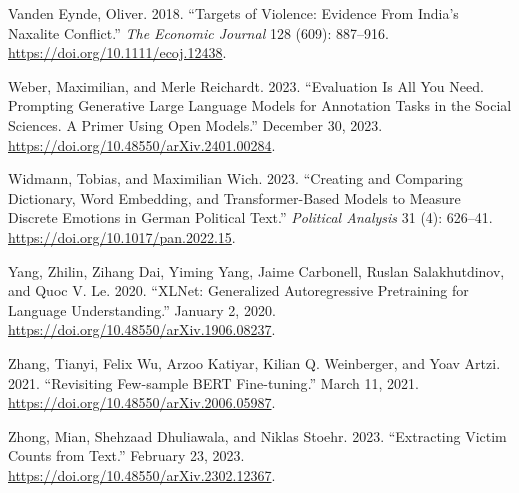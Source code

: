 \documentclass[
  11pt,
]{article}
\newlength{\cslhangindent}
\newenvironment{CSLReferences}[2] %
 {\begin{list}{}{%
  \setlength{\itemindent}{0pt}
  \setlength{\leftmargin}{0pt}
  \setlength{\parsep}{0pt}
  \ifodd #1
   \setlength{\leftmargin}{\cslhangindent}
   \setlength{\itemindent}{-1\cslhangindent}
  \fi
  \setlength{\itemsep}{#2\baselineskip}}}
 {\end{list}}
\begin{document}
\begin{CSLReferences}{1}{0}
Vanden Eynde, Oliver. 2018. {``Targets of {Violence}: {Evidence From
India}'s {Naxalite Conflict}.''} \emph{The Economic Journal} 128 (609):
887--916. \url{https://doi.org/10.1111/ecoj.12438}.

Weber, Maximilian, and Merle Reichardt. 2023. {``Evaluation Is All You
Need. {Prompting Generative Large Language Models} for {Annotation
Tasks} in the {Social Sciences}. {A Primer} Using {Open Models}.''}
December 30, 2023. \url{https://doi.org/10.48550/arXiv.2401.00284}.

Widmann, Tobias, and Maximilian Wich. 2023. {``Creating and {Comparing
Dictionary}, {Word Embedding}, and {Transformer-Based Models} to
{Measure Discrete Emotions} in {German Political Text}.''}
\emph{Political Analysis} 31 (4): 626--41.
\url{https://doi.org/10.1017/pan.2022.15}.

Yang, Zhilin, Zihang Dai, Yiming Yang, Jaime Carbonell, Ruslan
Salakhutdinov, and Quoc V. Le. 2020. {``{XLNet}: {Generalized
Autoregressive Pretraining} for {Language Understanding}.''} January 2,
2020. \url{https://doi.org/10.48550/arXiv.1906.08237}.

Zhang, Tianyi, Felix Wu, Arzoo Katiyar, Kilian Q. Weinberger, and Yoav
Artzi. 2021. {``Revisiting {Few-sample BERT Fine-tuning}.''} March 11,
2021. \url{https://doi.org/10.48550/arXiv.2006.05987}.

Zhong, Mian, Shehzaad Dhuliawala, and Niklas Stoehr. 2023. {``Extracting
{Victim Counts} from {Text}.''} February 23, 2023.
\url{https://doi.org/10.48550/arXiv.2302.12367}.

\end{CSLReferences}
\end{document}
